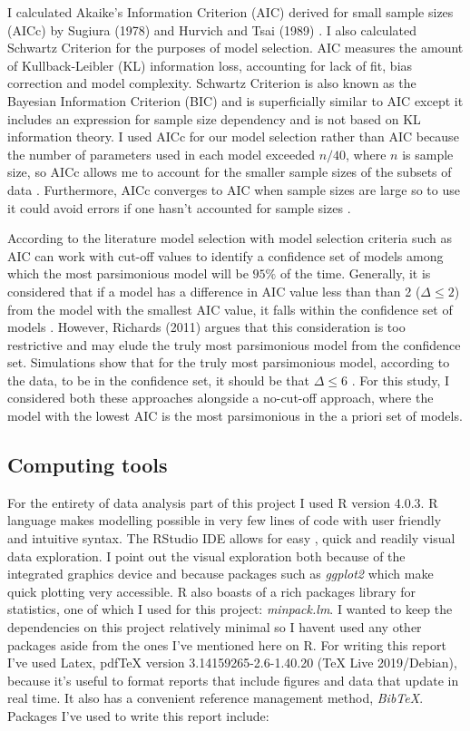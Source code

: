 \documentclass[11pt]{article}
\begin{document}
    I calculated Akaike’s Information Criterion (AIC) derived for small sample sizes (AICc) by Sugiura (1978) and Hurvich and Tsai (1989) \cite{Burnham2011}. I also calculated Schwartz Criterion for the purposes of model selection. AIC measures the amount of Kullback-Leibler (KL) information loss, accounting for lack of fit, bias correction and model complexity. Schwartz Criterion is also known as the Bayesian Information Criterion (BIC) and is superficially similar to AIC except it includes an expression for sample size dependency and is not based on KL information theory. I used AICc for our model selection rather than AIC because the number of parameters used in each model exceeded $n/40$, where $n$ is sample size, so AICc allows me to account for the smaller sample sizes of the subsets of data \cite{JohnsonOmland2004}. Furthermore, AICc converges to AIC when sample sizes are large so to use it could avoid errors if one hasn't accounted for sample sizes \cite{Burnham2011}.

    According to the literature model selection with model selection criteria such as AIC can work with cut-off values to identify a confidence set of models among which the most parsimonious model will be $95\%$ of the time. Generally, it is considered that if a model has a difference in AIC value less than than 2 ($\Delta\leq2$) from the model with the smallest AIC value, it falls within the confidence set of models \cite{BurnhamKennethP2002}. However, Richards (2011) argues that this consideration is too restrictive and may elude the truly most parsimonious model from the confidence set. Simulations show that for the truly most parsimonious model, according to the data, to be in the confidence set, it should be that $\Delta\leq6$ \cite{Richards2011}. For this study, I considered both these approaches alongside a no-cut-off approach, where the model with the lowest AIC is the most parsimonious in the a priori set of models.
      
    \subsection{Computing tools}
    For the entirety of data analysis part of this project I used R version 4.0.3. R language makes modelling possible in very few lines of code with user friendly and intuitive syntax. The RStudio IDE allows for easy , quick and readily visual data exploration. I point out the visual exploration both because of the integrated graphics device and because packages such as \emph{ggplot2} which make quick plotting very accessible. R also boasts of a rich packages library for statistics, one of which I used for this project: \emph{minpack.lm}. I wanted to keep the dependencies on this project relatively minimal so I havent used any other packages aside from the ones I've mentioned here on R. For writing this report I've used Latex, pdfTeX version 3.14159265-2.6-1.40.20 (TeX Live 2019/Debian), because it's useful to format reports that include figures and data that update in real time. It also has a convenient reference management method, \emph{BibTeX}. Packages I've used to write this report include:
\end{document}
